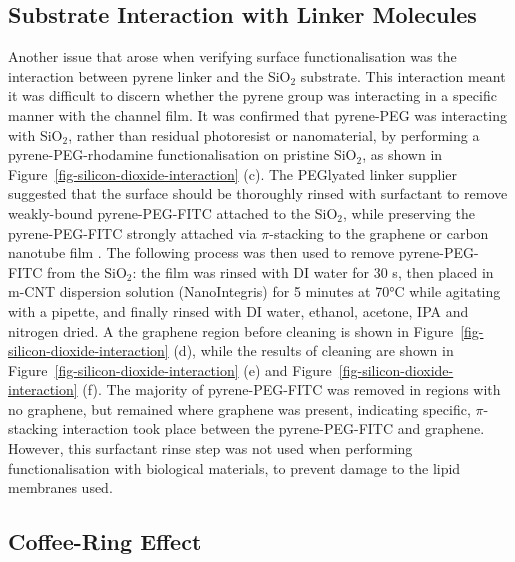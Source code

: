 \documentclass[
  a4paper,
]{scrbook}
\begin{document}
\hypertarget{sec-pyrene-interactions}{%
\subsection{Substrate Interaction with Linker
Molecules}\label{sec-pyrene-interactions}}

Another issue that arose when verifying surface functionalisation was
the interaction between pyrene linker and the SiO\(_2\) substrate. This
interaction meant it was difficult to discern whether the pyrene group
was interacting in a specific manner with the channel film. It was
confirmed that pyrene-PEG was interacting with SiO\(_2\), rather than
residual photoresist or nanomaterial, by performing a
pyrene-PEG-rhodamine functionalisation on pristine SiO\(_2\), as shown
in Figure~\ref{fig-silicon-dioxide-interaction} (c). The PEGlyated
linker supplier suggested that the surface should be thoroughly rinsed
with surfactant to remove weakly-bound pyrene-PEG-FITC attached to the
SiO\(_2\), while preserving the pyrene-PEG-FITC strongly attached via
\(\pi\)-stacking to the graphene or carbon nanotube film
\autocite{CreativePEGworks2022}. The following process was then used to
remove pyrene-PEG-FITC from the SiO\(_2\): the film was rinsed with DI
water for 30 s, then placed in m-CNT dispersion solution (NanoIntegris)
for 5 minutes at 70°C while agitating with a pipette, and finally rinsed
with DI water, ethanol, acetone, IPA and nitrogen dried. A the graphene
region before cleaning is shown in
Figure~\ref{fig-silicon-dioxide-interaction} (d), while the results of
cleaning are shown in Figure~\ref{fig-silicon-dioxide-interaction} (e)
and Figure~\ref{fig-silicon-dioxide-interaction} (f). The majority of
pyrene-PEG-FITC was removed in regions with no graphene, but remained
where graphene was present, indicating specific, \(\pi\)-stacking
interaction took place between the pyrene-PEG-FITC and graphene.
However, this surfactant rinse step was not used when performing
functionalisation with biological materials, to prevent damage to the
lipid membranes used.

\hypertarget{sec-coffee-ring}{%
\subsection{Coffee-Ring Effect}\label{sec-coffee-ring}}
\end{document}
